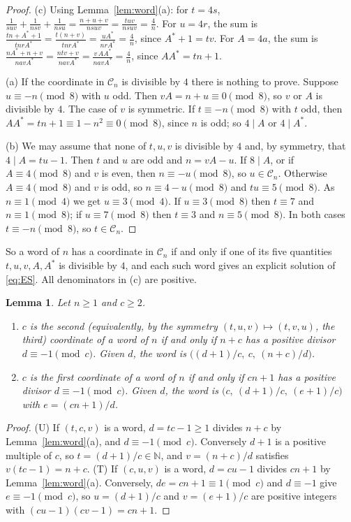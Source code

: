 \documentclass[11pt,reqno]{amsart}
\newtheorem{lemma}[theorem]{Lemma}
\theoremstyle{definition}
\newcommand{\N}{\mathbb N}
\newcommand{\cC}{\mathcal C}
\begin{document}
\begin{proof}
(c) Using Lemma~\ref{lem:word}(a): for $t=4s$,
$\frac{1}{suv}+\frac{1}{nsv}+\frac{1}{nsu}=\frac{n+u+v}{nsuv}=\frac{tuv}{nsuv}=\frac4n$.
For $u=4r$, the sum is $\frac{tn+A^*+1}{tnrA^*}=\frac{t(n+v)}{tnrA^*}
=\frac{uA^*}{nrA^*}=\frac4n$, since $A^*+1=tv$.  For $A=4a$, the sum is
$\frac{nA^*+n+v}{navA^*}=\frac{ntv+v}{navA^*}=\frac{v\,AA^*}{navA^*}=\frac4n$,
since $AA^*=tn+1$.

(a) If the coordinate in $\cC_n$ is divisible by $4$ there is nothing to
prove.  Suppose $u\equiv-n\pmod8$ with $u$ odd.  Then
$vA=n+u\equiv0\pmod8$, so $v$ or $A$ is divisible by $4$.  The case of $v$
is symmetric.  If $t\equiv-n\pmod 8$ with $t$ odd, then
$AA^*=tn+1\equiv1-n^2\equiv0\pmod8$, since $n$ is odd; so $4\mid A$ or
$4\mid A^*$.

(b) We may assume that none of $t,u,v$ is divisible by $4$ and, by
symmetry, that $4\mid A=tu-1$.  Then $t$ and $u$ are odd and $n=vA-u$.  If
$8\mid A$, or if $A\equiv4\pmod8$ and $v$ is even, then $n\equiv-u\pmod8$,
so $u\in\cC_n$.  Otherwise $A\equiv4\pmod8$ and $v$ is odd, so
$n\equiv4-u\pmod 8$ and $tu\equiv5\pmod8$.  As $n\equiv1\pmod4$ we get
$u\equiv3\pmod4$.  If $u\equiv3\pmod8$ then $t\equiv7$ and $n\equiv1\pmod
8$; if $u\equiv7\pmod8$ then $t\equiv3$ and $n\equiv5\pmod8$.  In both
cases $t\equiv-n\pmod8$, so $t\in\cC_n$.
\end{proof}

So a word of $n$ has a coordinate in $\cC_n$ if and only if one of its five
quantities $t,u,v,A,A^*$ is divisible by $4$, and each such word gives an
explicit solution of \eqref{eq:ES}.  All denominators in (c) are positive.

\begin{lemma}\label{lem:lines}
Let $n\ge1$ and $c\ge2$.
\begin{enumerate}
\item[(U)] $c$ is the second (equivalently, by the symmetry
$(t,u,v)\mapsto(t,v,u)$, the third) coordinate of a word of $n$ if and
only if $n+c$ has a positive divisor $d\equiv-1\pmod c$.  Given $d$, the
word is $\bigl((d+1)/c,\ c,\ (n+c)/d\bigr)$.
\item[(T)] $c$ is the first coordinate of a word of $n$ if and only if
$cn+1$ has a positive divisor $d\equiv-1\pmod c$.  Given $d$, the word is
$\bigl(c,\ (d+1)/c,\ (e+1)/c\bigr)$ with $e=(cn+1)/d$.
\end{enumerate}
\end{lemma}

\begin{proof}
(U) If $(t,c,v)$ is a word, $d=tc-1\ge1$ divides $n+c$ by
Lemma~\ref{lem:word}(a), and $d\equiv-1\pmod c$.  Conversely $d+1$ is a
positive multiple of $c$, so $t=(d+1)/c\in\N$, and $v=(n+c)/d$ satisfies
$v(tc-1)=n+c$.  (T) If $(c,u,v)$ is a word, $d=cu-1$ divides $cn+1$ by
Lemma~\ref{lem:word}(a).  Conversely, $de=cn+1\equiv1\pmod c$ and
$d\equiv-1$ give $e\equiv-1\pmod c$, so $u=(d+1)/c$ and $v=(e+1)/c$ are
positive integers with $(cu-1)(cv-1)=cn+1$.
\end{proof}
\end{document}
